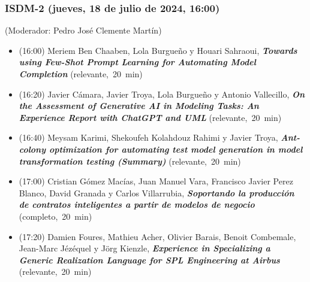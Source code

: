\begin{frame}
  \frametitle{ISDM-2 (jueves, 18 de julio de 2024, 16:00)}
{\small (Moderador: Pedro José Clemente Martín)}
\begin{itemize}


\item {(16:00) Meriem Ben Chaaben, Lola Burgueño y Houari Sahraoui}, %
      {\bfseries\itshape Towards using Few-Shot Prompt Learning for Automating Model Completion} %
      {(relevante,~20~min)}
      

\item {(16:20) Javier Cámara, Javier Troya, Lola Burgueño y Antonio Vallecillo}, %
      {\bfseries\itshape On the Assessment of Generative AI in Modeling Tasks: An Experience Report with ChatGPT and UML} %
      {(relevante,~20~min)}
      

\item {(16:40) Meysam Karimi, Shekoufeh Kolahdouz Rahimi y Javier Troya}, %
      {\bfseries\itshape Ant-colony optimization for automating test model generation in model transformation testing (Summary)} %
      {(relevante,~20~min)}
      

\item {(17:00) Cristian Gómez Macías, Juan Manuel Vara, Francisco Javier Perez Blanco, David Granada y Carlos Villarrubia}, %
      {\bfseries\itshape Soportando la producción de contratos inteligentes a partir de modelos de negocio} %
      {(completo,~20~min)}
      

\item {(17:20) Damien Foures, Mathieu Acher, Olivier Barais, Benoit Combemale, Jean-Marc Jézéquel y Jörg Kienzle}, %
      {\bfseries\itshape Experience in Specializing a Generic Realization Language for SPL Engineering at Airbus} %
      {(relevante,~20~min)}
      

\end{itemize}
\end{frame}